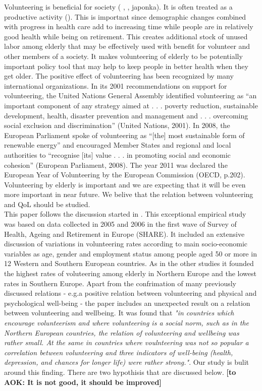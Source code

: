 \documentclass[10pt, letterpaper]{article}
\begin{document}
\begin{spacing}{1.4}
Volunteering is beneficial for society ( \citet{Oecd15}, \cite{prouteau06}, japonka). It is often treated as a productive activity (\citet{hank09}). This is importnat since demographic changes combined with progress in health care add to increasing time while people are in relatively good health while being on retirement. This creates additional  stock of unused labor among elderly that may be effectively used with benefit for volunteer and other members of a society.  It makes   volunteering of elderly to be potentially important policy tool that may help to keep people in better health when they get older. The positive effect of volunteering has been recognized by many international organizations. In its 2001 recommendations on support for volunteering, the United Nations General Assembly identified volunteering as “an important component of any strategy aimed at . . . poverty reduction, sustainable development, health, disaster prevention and management and . . . overcoming social exclusion and discrimination” (United Nations, 2001). In 2008, the European Parliament spoke of volunteering as “[the] most sustainable form of renewable energy” and encouraged Member States and regional and local authorities to “recognise [its] value . . . in promoting social and economic cohesion” (European Parliament, 2008). The year 2011 was declared the European Year of Volunteering by the European Commission (OECD, p.202). Volunteering by elderly is important and we are expecting that it will be even more important in near future. We belive that the relation between volunteering and QoL should be studied. \\


This paper follows the discussion started in \citet{haski09}.  This exceptional empirical study was based on data collected in 2005 and 2006 in the first wave of Survey of Health, Ageing and Retirement in Europe (SHARE). It included an extensive discussion of variations in volunteering rates according to main socio-economic variables as age, gender and employment status among people aged 50 or more in 12 Western and Southern European countries. As in the other studies it founded  the highest rates of voluteering among elderly in Northern Europe and the lowest rates in Southern Europe. Apart from the confrimation of many previously discussed relations - e.g.a positive relation between volunteering and physical and psychological well-being - the paper includes an unexpected result on a relation between volunteering and wellbeing. It was found that \textit{"in countries which encourage volunteerism and where volunteering is a social norm, such as in the Northern European countries, the relation of volunteering and wellbeing was rather small. At the same in countries where voulnteering was not so popular  a correlation between volunteering and three indicators of well-being (health, depression, and chances for longer life) were rather strong."}.  Our study is bulit around this finding. There are two hypothisis that are discussed below. \textbf{[to AOK: It is not good, it should be improved]} \\


\end{spacing}
\end{document}
